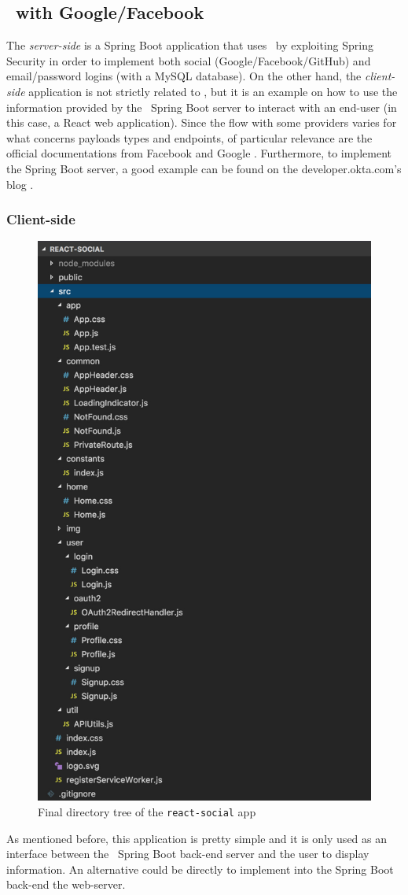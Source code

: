 \subsection{\oauth\ with Google/Facebook}
The \textit{server-side} is a Spring Boot application that uses \oauth\ by exploiting Spring Security in order to implement both social (Google/Facebook/GitHub) and email/password logins (with a MySQL database). On the other hand, the \textit{client-side} application is not strictly related to \oauth, but it is an example on how to use the information provided by the \oauth\ Spring Boot server to interact with an end-user (in this case, a React web application). Since the flow with some providers varies for what concerns payloads types and endpoints, of particular relevance are the official documentations from Facebook \cite{facebook} and Google \cite{google1, google2}. Furthermore, to implement the Spring Boot server, a good example can be found on the developer.okta.com's blog \cite{sprboot}. 

\subsubsection{Client-side}

\begin{figure}
  \begin{center}
    \includegraphics[width=0.31 \textwidth]{chapters/images/chp6/dirreact.jpg}
  \end{center}
  \caption{Final directory tree of the \texttt{react-social} app}
  \label{fig:dirtree}
\end{figure}

As mentioned before, this application is pretty simple and it is only used as an interface between the \oauth\ Spring Boot back-end server and the user to display information. An alternative could be directly to implement into the Spring Boot back-end the web-server.

